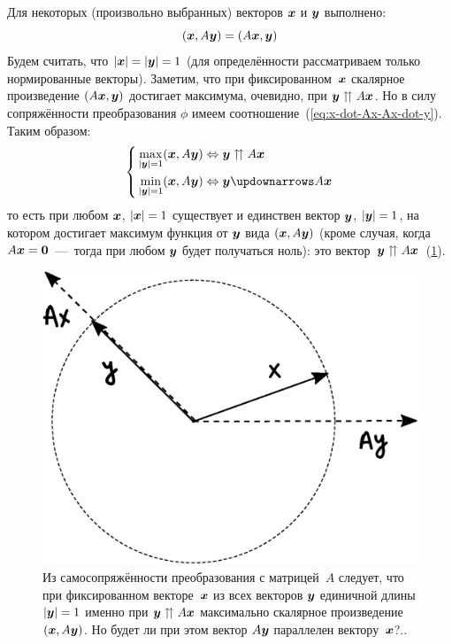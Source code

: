 \documentclass[a4paper,12pt]{article}
\theoremstyle{remark}
\begin{document}
  Для некоторых (произвольно выбранных) векторов $\boldsymbol x$ и $\boldsymbol y$ выполнено:
  \begin{equation}\label{eq:x-dot-Ax-Ax-dot-y}
    (\boldsymbol x, A \boldsymbol y) = (A \boldsymbol x, \boldsymbol y)
  \end{equation}
  Будем считать, что $|\bds x| \hm= |\bds y| \hm= 1$ (для определённости рассматриваем только нормированные векторы).
  Заметим, что при фиксированном~$\boldsymbol x$ скалярное произведение $(A \boldsymbol x, \boldsymbol y)$ достигает максимума, очевидно, при $\bds y \hm\upuparrows A \bds x$.
  Но в силу сопряжённости преобразования $\phi$ имеем соотношение~(\ref{eq:x-dot-Ax-Ax-dot-y}).
  Таким образом:
  \begin{equation}\label{eq:min-max-scalar}
    \left\{
      \begin{aligned}
        &\max_{|\bds y| = 1} (\bds x, A \bds y) \Leftrightarrow \bds y \upuparrows A \bds x\\
        &\min_{|\bds y| = 1} (\bds x, A \bds y) \Leftrightarrow \bds y \updownarrows A \bds x
      \end{aligned}
    \right.
  \end{equation}
  то есть при любом $\boldsymbol x$, $|\bds x| \hm= 1$ существует и единствен вектор $\boldsymbol y$, $|\bds y| \hm= 1$, на котором достигает максимум функция от $\boldsymbol y$ вида $(\boldsymbol x, A \boldsymbol y)$ (кроме случая, когда $A \bds x \hm= \bds 0$~---~тогда при любом $\boldsymbol y$ будет получаться ноль): это вектор~$\bds y \hm\upuparrows A \bds x$~(\ref{fig:self-adjo-on-the-way-to-understand}).
  
  \begin{figure}
    \centering
    
    \includegraphics[width=0.5\columnwidth]{self-adjo-on-the-way-to-understand}
    
    \caption{Из самосопряжённости преобразования с матрицей~$A$ следует, что при фиксированном векторе~$\boldsymbol x$ из всех векторов $\boldsymbol y$ единичной длины $|\bds y| \hm= 1$ именно при $\bds y \hm\upuparrows A \bds x$ максимально скалярное произведение $(\boldsymbol x, A \boldsymbol y)$. Но будет ли при этом вектор $A \boldsymbol y$ параллелен вектору~$\boldsymbol x$?..}
    \label{fig:self-adjo-on-the-way-to-understand}
  \end{figure}
  
\end{document}
